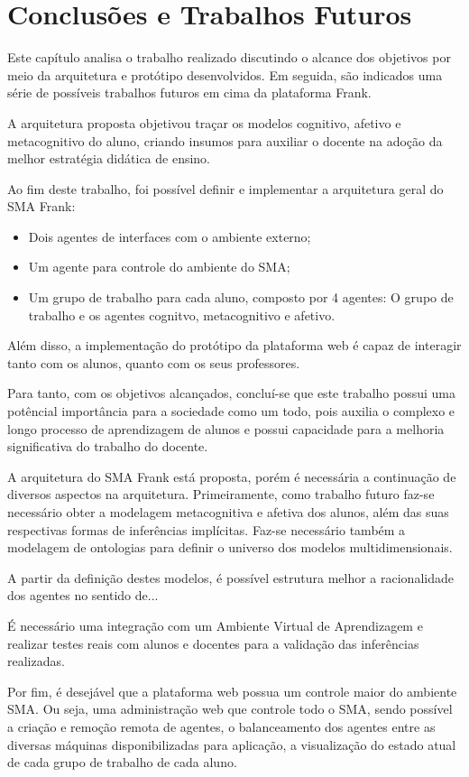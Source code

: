 \chapter{Conclusões e Trabalhos Futuros}
Este capítulo analisa o trabalho realizado discutindo o alcance dos objetivos por meio da arquitetura e protótipo desenvolvidos. Em seguida, são indicados uma série de possíveis trabalhos futuros em cima da plataforma Frank.

A arquitetura proposta objetivou traçar os modelos cognitivo, afetivo e metacognitivo do aluno, criando insumos para auxiliar o docente na adoção da melhor estratégia didática de ensino.

Ao fim deste trabalho, foi possível definir e implementar a arquitetura geral do SMA Frank:
\begin{itemize}
 	\item Dois agentes de interfaces com o ambiente externo;
	\item Um agente para controle do ambiente do SMA;
	\item Um grupo de trabalho para cada aluno, composto por 4 agentes: O grupo de trabalho e os agentes cognitvo, metacognitivo e afetivo.
\end{itemize}

Além disso, a implementação do protótipo da plataforma web é capaz de interagir tanto com os alunos, quanto com os seus professores.

Para tanto, com os objetivos alcançados, concluí-se que este trabalho possui uma potêncial importância para a sociedade como um todo, pois auxilia o complexo e longo processo de aprendizagem de alunos e possui capacidade para a melhoria significativa do trabalho do docente.

A arquitetura do SMA Frank está proposta, porém é necessária a continuação de diversos aspectos na arquitetura. Primeiramente, como trabalho futuro faz-se necessário obter a modelagem metacognitiva e afetiva dos alunos, além das suas respectivas formas de inferências implícitas. Faz-se necessário também a modelagem de ontologias para definir o universo dos modelos multidimensionais.

A partir da definição destes modelos, é possível estrutura melhor a racionalidade dos agentes no sentido de...

É necessário uma integração com um Ambiente Virtual de Aprendizagem e realizar testes reais com alunos e docentes para a validação das inferências realizadas.

Por fim, é desejável que a plataforma web possua um controle maior do ambiente SMA. Ou seja, uma administração web que controle todo o SMA, sendo possível a criação e remoção remota de agentes, o balanceamento dos agentes entre as diversas máquinas disponibilizadas para aplicação, a visualização do estado atual de cada grupo de trabalho de cada aluno.
